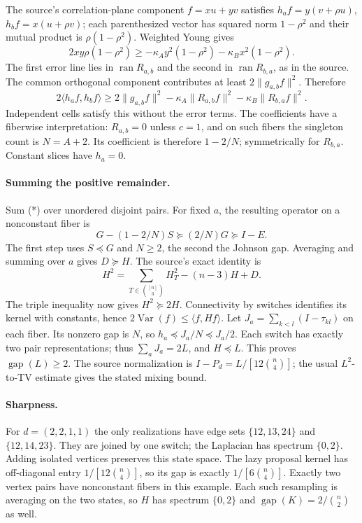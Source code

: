 \documentclass[11pt]{article}
\newcommand{\Var}{\operatorname{Var}}
\newcommand{\gap}{\operatorname{gap}}
\begin{document}
The source's correlation-plane component $f=xu+yv$ satisfies
$h_a f=y(v+\rho u)$, $h_b f=x(u+\rho v)$; each parenthesized vector has
squared norm $1-\rho^2$ and their mutual product is $\rho(1-\rho^2)$.
Weighted Young gives
\[
 2xy\rho(1-\rho^2)\ge
 -\kappa_A y^2(1-\rho^2)-\kappa_B x^2(1-\rho^2).
\]
The first error line lies in $\operatorname{ran}R_{a,b}$ and the second
in $\operatorname{ran}R_{b,a}$, as in the source. The common orthogonal
component contributes at least $2\|g_{a,b}f\|^2$. Therefore
\[
 2\langle h_af,h_bf\rangle\ge2\|g_{a,b}f\|^2
       -\kappa_A\|R_{a,b}f\|^2-\kappa_B\|R_{b,a}f\|^2.\tag{*}
\]
Independent cells satisfy this without the error terms. The coefficients
have a fiberwise interpretation: $R_{a,b}=0$ unless $c=1$, and on such
fibers the singleton count is $N=A+2$. Its coefficient is therefore
$1-2/N$; symmetrically for $R_{b,a}$. Constant slices have $h_a=0$.

\paragraph{Summing the positive remainder.}
Sum (*) over unordered disjoint pairs. For fixed $a$, the resulting
operator on a nonconstant fiber is
\[
 G-(1-2/N)S\succeq(2/N)G\succeq I-E.
\]
The first step uses $S\preceq G$ and $N\ge2$, the second the Johnson
gap. Averaging and summing over $a$ gives $D\succeq H$.
\newpage
The source's exact identity is
\[
 H^2=\sum_{T\in\binom{[n]}3}H_T^2-(n-3)H+D.
\]
The triple inequality now gives $H^2\succeq2H$. Connectivity by switches
identifies its kernel with constants, hence
$2\Var(f)\le\langle f,Hf\rangle$.
Let $J_a=\sum_{k<l}(I-\tau_{kl})$ on each fiber. Its nonzero gap is $N$,
so $h_a\preceq J_a/N\preceq J_a/2$. Each switch has exactly two pair
representations; thus $\sum_aJ_a=2L$, and $H\preceq L$.
This proves $\gap(L)\ge2$. The source normalization is
$I-P_d=L/[12\binom n4]$; the usual $L^2$-to-TV estimate gives the
stated mixing bound.

\paragraph{Sharpness.}
For $d=(2,2,1,1)$ the only realizations have edge sets $\{12,13,24\}$
and $\{12,14,23\}$. They are joined by one switch; the Laplacian has
spectrum $\{0,2\}$. Adding isolated vertices preserves this state space.
The lazy proposal kernel has off-diagonal entry $1/[12\binom n4]$,
so its gap is exactly $1/[6\binom n4]$.
Exactly two vertex pairs have nonconstant fibers in this example.
Each such resampling is averaging on the two states, so $H$ has spectrum
$\{0,2\}$ and $\gap(K)=2/\binom n2$ as well.
\end{document}
